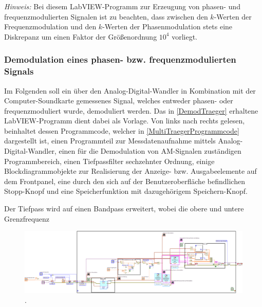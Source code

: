 \documentclass[
a4paper,
12pt,
pagesize,
ngerman
]{scrartcl}
\begin{document}
	\emph{Hinweis:} Bei diesem LabVIEW-Programm zur Erzeugung von phasen- und frequenzmodulierten Signalen ist zu beachten, dass zwischen den $k$-Werten der Frequenzmodulation und den $k$-Werten der Phasenmodulation stets eine Diskrepanz um einen Faktor der Größenordnung $10^4$ vorliegt.
	
	
	
	\subsubsection{Demodulation eines phasen- bzw. frequenzmodulierten Signals}
	
	Im Folgenden soll ein über den Analog-Digital-Wandler in Kombination mit der Computer-Soundkarte gemessenes Signal, welches entweder phasen- oder frequenzmoduliert wurde, demoduliert werden. 
	Das in \cref{DemodTraeger} erhaltene LabVIEW-Programm dient dabei als Vorlage. 
	Von links nach rechts gelesen, beinhaltet dessen Programmcode, welcher in \cref{MultiTraegerProgrammcode} dargestellt ist, einen Programmteil zur Messdatenaufnahme mittels Analog-Digital-Wandler, einen für die Demodulation von AM-Signalen zuständigen Programmbereich, einen Tiefpassfilter sechzehnter Ordnung, einige Blockdiagrammobjekte zur Realisierung der Anzeige- bzw. Ausgabeelemente auf dem Frontpanel, eine durch den sich auf der Benutzeroberfläche befindlichen \glqq Stopp\grqq -Knopf und eine Speicherfunktion mit dazugehörigem \glqq Speichern\grqq -Knopf.
	
	
	Der Tiefpass wird auf einen Bandpass erweitert, wobei die obere und untere Grenzfrequenz 
	
	\begin{figure}[H]
		\centering
		\includegraphics[width=1.0\textwidth]{EIRE2018Dateien/Tag4/OsziFMPM-Demod/FM/OsziPlusFMPMd}
		\caption{.}
	\end{figure}
	
\end{document}

